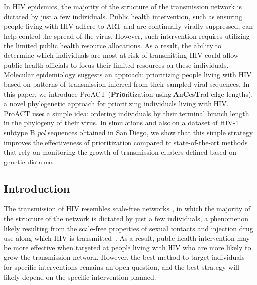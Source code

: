 \newcommand{\PLH}{H$^+$I\xspace}
\newcommand{\PLWH}{SH$^+$I\xspace}

\chapter{\proacttitle}
\label{chap:proact}
\clearpage

In \gls{HIV} epidemics, the majority of the structure of the transmission network is dictated by just a few individuals. Public health intervention, such as ensuring people living with \gls{HIV} adhere to \gls{ART} and are continually virally-suppressed, can help control the spread of the virus. However, such intervention requires utilizing the limited public health resource allocations. As a result, the ability to determine which individuals are most at-risk of transmitting \gls{HIV} could allow public health officials to focus their limited resources on these individuals. Molecular epidemiology suggests an approach: prioritizing people living with HIV based on patterns of transmission inferred from their sampled viral sequences. In this paper, we introduce ProACT (\textbf{Pr}i\textbf{o}ritization using \textbf{A}n\textbf{C}es\textbf{T}ral edge lengths), a novel phylogenetic approach for prioritizing individuals living with \gls{HIV}. ProACT uses a simple idea: ordering individuals by their terminal branch length in the phylogeny of their virus. In simulations and also on a dataset of \gls{HIV}-1 subtype B \textit{pol} sequences obtained in San Diego, we show that this simple strategy improves the effectiveness of prioritization compared to state-of-the-art methods that rely on monitoring the growth of transmission clusters defined based on genetic distance.

\section{Introduction}
The transmission of \gls{HIV} resembles scale-free networks~\cite{Wertheim2014}, in which the majority of the structure of the network is dictated by just a few individuals, a phenomenon likely resulting from the scale-free properties of sexual contacts and injection drug use along which \gls{HIV} is transmitted~\cite{Little2014,Schneeberger2004}. As a result, public health intervention may be more effective when targeted at people living with \gls{HIV} who are more likely to grow the transmission network. However, the best method to target individuals for specific interventions remains an open question, and the best strategy will likely depend on the specific intervention planned.

